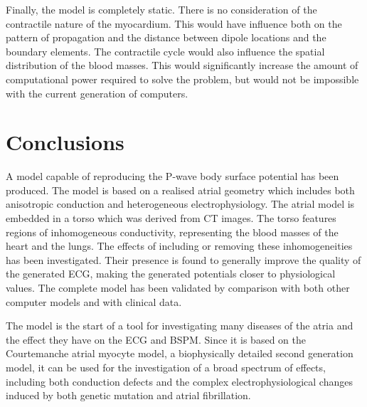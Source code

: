 Finally, the model is completely static.
There is no consideration of the contractile nature of the myocardium.
This would have influence both on the pattern of propagation and the distance
between dipole locations and the boundary elements.
The contractile cycle would also influence the spatial distribution of the
blood masses.
This would significantly increase the amount of computational power required to
solve the problem, but would not be impossible with the current generation of
computers.

\section{Conclusions}

A model capable of reproducing the P-wave body surface potential has been
produced.
The model is based on a realised atrial geometry which includes both anisotropic
conduction and heterogeneous electrophysiology.
The atrial model is embedded in a torso which was derived from CT images.
The torso features regions of inhomogeneous conductivity, representing the blood
masses of the heart and the lungs.
The effects of including or removing these inhomogeneities has been
investigated.
Their presence is found to generally improve the quality of the generated ECG,
making the generated potentials closer to physiological values.
The complete model has been validated by comparison with both other computer
models and with clinical data.

The model is the start of a tool for investigating many diseases of the atria
and the effect they have on the ECG and BSPM.
Since it is based on the Courtemanche atrial myocyte model, a biophysically
detailed second generation model, it can be used for the investigation of a
broad spectrum of effects, including both conduction defects and the complex
electrophysiological changes induced by both genetic mutation and atrial
fibrillation.
